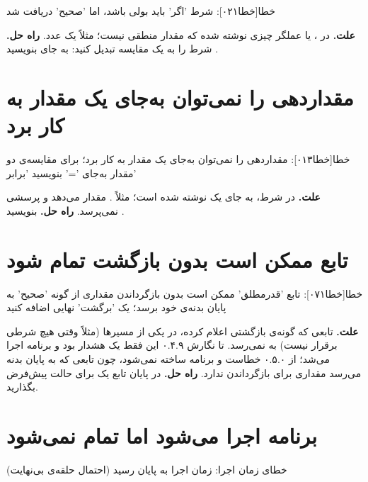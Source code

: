 \begin{progoutfa}
خطا[خطا۰۲۱]: شرط 'اگر' باید بولی باشد، اما 'صحیح' دریافت شد
\end{progoutfa}

\textbf{علت.} در ،  یا عملگر  چیزی نوشته
شده که مقدار منطقی نیست؛ مثلاً یک عدد.
\textbf{راه حل.} شرط را به یک مقایسه تبدیل کنید: به جای 
بنویسید .

\section*{مقداردهی را نمی‌توان به‌جای یک مقدار به کار برد}

\begin{progoutfa}
خطا[خطا۰۱۳]: مقداردهی را نمی‌توان به‌جای یک مقدار به کار برد؛
برای مقایسه‌ی دو مقدار به‌جای '=' بنویسید 'برابر'
\end{progoutfa}

\textbf{علت.} در شرط، به جای  یک \code{=} نوشته شده است؛ مثلاً
. \code{=} مقدار می‌دهد و پرسشی نمی‌پرسد.
\textbf{راه حل.} بنویسید .

\section*{تابع ممکن است بدون بازگشت تمام شود}

\begin{progoutfa}
خطا[خطا۰۷۱]: تابع 'قدرمطلق' ممکن است بدون بازگرداندن مقداری
از گونه 'صحیح' به پایان بدنه‌ی خود برسد؛ یک 'برگشت' نهایی اضافه کنید
\end{progoutfa}

\textbf{علت.} تابعی که گونه‌ی بازگشتی اعلام کرده، در یکی از مسیرها (مثلاً
وقتی هیچ شرطی برقرار نیست) به  نمی‌رسد. تا نگارش ۰.۴.۹ این فقط
یک هشدار بود و برنامه اجرا می‌شد؛ از ۰.۵.۰ خطاست و برنامه ساخته
نمی‌شود، چون تابعی که به پایان بدنه می‌رسد مقداری برای بازگرداندن
ندارد.
\textbf{راه حل.} در پایان تابع یک  برای حالت پیش‌فرض
بگذارید.

\section*{برنامه اجرا می‌شود اما تمام نمی‌شود}

\begin{progoutfa}
خطای زمان اجرا: زمان اجرا به پایان رسید (احتمال حلقه‌ی بی‌نهایت)
\end{progoutfa}

